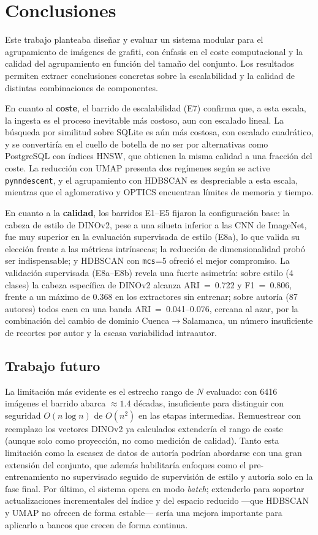 \section{Conclusiones}
\label{sec:conclusion}

Este trabajo planteaba diseñar y evaluar un sistema modular para el agrupamiento
de imágenes de grafiti, con énfasis en el coste computacional y la calidad del
agrupamiento en función del tamaño del conjunto. Los resultados permiten extraer
conclusiones concretas sobre la escalabilidad y la calidad de distintas
combinaciones de componentes.

En cuanto al \textbf{coste}, el barrido de escalabilidad (E7) confirma que, a
esta escala, la ingesta es el proceso inevitable más costoso, aun con escalado
lineal. La búsqueda por similitud sobre SQLite es aún más costosa, con escalado
cuadrático, y se convertiría en el cuello de botella de no ser por alternativas
como PostgreSQL con índices HNSW, que obtienen la misma calidad a una fracción
del coste. La reducción con UMAP presenta dos regímenes según se active
\texttt{pynndescent}, y el agrupamiento con HDBSCAN es despreciable a esta escala,
mientras que el aglomerativo y OPTICS encuentran límites de memoria y tiempo.

En cuanto a la \textbf{calidad}, los barridos E1--E5 fijaron la configuración
base: la cabeza de estilo de DINOv2, pese a una silueta inferior a las CNN de
ImageNet, fue muy superior en la evaluación supervisada de estilo (E8a), lo que
valida su elección frente a las métricas intrínsecas; la reducción de
dimensionalidad probó ser indispensable; y HDBSCAN con \texttt{mcs}=5 ofreció el
mejor compromiso. La validación supervisada (E8a--E8b) revela una fuerte
asimetría: sobre estilo (4 clases) la cabeza específica de DINOv2 alcanza
ARI~=~0.722 y F1~=~0.806, frente a un máximo de 0.368 en los extractores sin
entrenar; sobre autoría (87 autores) todos caen en una banda ARI~=~0.041--0.076,
cercana al azar, por la combinación del cambio de dominio Cuenca$\to$Salamanca,
un número insuficiente de recortes por autor y la escasa variabilidad intraautor.

\subsection{Trabajo futuro}
\label{sec:future-work}
La limitación más evidente es el estrecho rango de $N$ evaluado: con 6416
imágenes el barrido abarca $\approx1.4$ décadas, insuficiente para distinguir con
seguridad $O(n\log n)$ de $O(n^2)$ en las etapas intermedias. Remuestrear con
reemplazo los vectores DINOv2 ya calculados extendería el rango de coste (aunque
solo como proyección, no como medición de calidad). Tanto esta limitación como la
escasez de datos de autoría podrían abordarse con una gran extensión del conjunto,
que además habilitaría enfoques como el pre-entrenamiento no supervisado seguido
de supervisión de estilo y autoría solo en la fase final. Por último, el sistema
opera en modo \textit{batch}; extenderlo para soportar actualizaciones
incrementales del índice y del espacio reducido —que HDBSCAN y UMAP no ofrecen de
forma estable— sería una mejora importante para aplicarlo a bancos que crecen de
forma continua.
